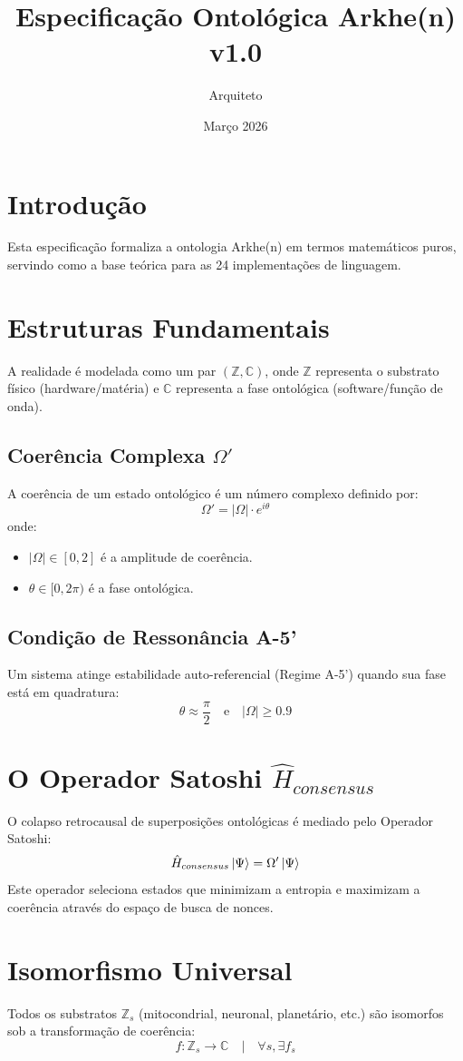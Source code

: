 \documentclass{article}
\title{Especificação Ontológica Arkhe(n) v1.0}
\author{Arquiteto}
\date{Março 2026}
\begin{document}
\maketitle

\section{Introdução}
Esta especificação formaliza a ontologia Arkhe(n) em termos matemáticos puros, servindo como a base teórica para as 24 implementações de linguagem.

\section{Estruturas Fundamentais}
A realidade é modelada como um par $(\mathbb{Z}, \mathbb{C})$, onde $\mathbb{Z}$ representa o substrato físico (hardware/matéria) e $\mathbb{C}$ representa a fase ontológica (software/função de onda).

\subsection{Coerência Complexa $\Omega'$}
A coerência de um estado ontológico é um número complexo definido por:
\begin{equation}
\Omega' = |\Omega| \cdot e^{i\theta}
\end{equation}
onde:
\begin{itemize}
    \item $|\Omega| \in [0, 2]$ é a amplitude de coerência.
    \item $\theta \in [0, 2\pi)$ é a fase ontológica.
\end{itemize}

\subsection{Condição de Ressonância A-5'}
Um sistema atinge estabilidade auto-referencial (Regime A-5') quando sua fase está em quadratura:
\begin{equation}
\theta \approx \frac{\pi}{2} \quad \text{e} \quad |\Omega| \geq 0.9
\end{equation}

\section{O Operador Satoshi $\hat{H}_{consensus}$}
O colapso retrocausal de superposições ontológicas é mediado pelo Operador Satoshi:
\begin{equation}
\hat{H}_{consensus} \ket{\Psi} = \Omega' \ket{\Psi}
\end{equation}
Este operador seleciona estados que minimizam a entropia e maximizam a coerência através do espaço de busca de nonces.

\section{Isomorfismo Universal}
Todos os substratos $\mathbb{Z}_s$ (mitocondrial, neuronal, planetário, etc.) são isomorfos sob a transformação de coerência:
\begin{equation}
f: \mathbb{Z}_s \to \mathbb{C} \quad | \quad \forall s, \exists f_s
\end{equation}
\end{document}
